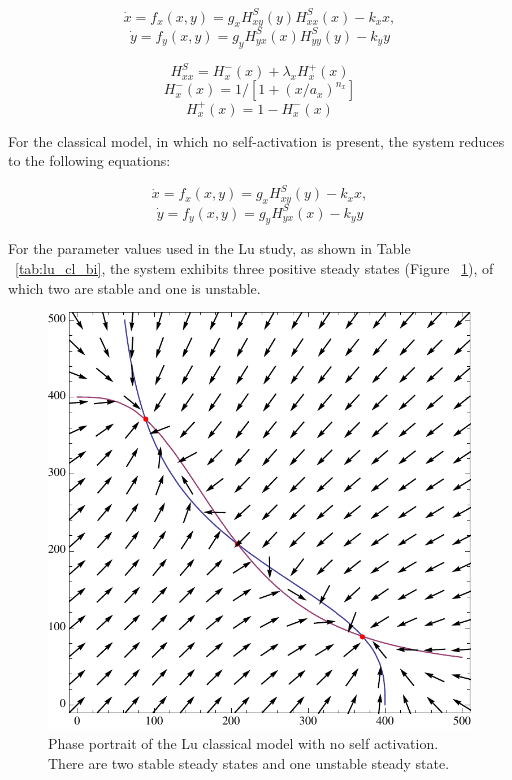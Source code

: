 \begin{equation}\dot{x}=f_{x}(x,y)=g_{x}H^{S}_{xy}(y)H^{S}_{xx}(x)-k_{x}x,\label{eq:lu_both_1}\end{equation}
\begin{equation}\dot{y}=f_{y}(x,y)=g_{y}H^{S}_{yx}(x)H^{S}_{yy}(y)-k_{y}y\label{eq:lu_both_2}\end{equation}

\begin{equation}H^{S}_{xx}=H^{-}_{x}(x)+\lambda_{x}H^{+}_{x}(x)\label{eq:lu_hsxx}\end{equation}
\begin{equation}H^{-}_{x}(x)=1/[1+(x/a_{x})^{n_{x}}]\label{eq:lu_hpx}\end{equation}
\begin{equation}H^{+}_{x}(x)=1-H^{-}_{x}(x)\label{eq:lu_hmx}\end{equation}

For the classical model, in which no self-activation is present, the system reduces to the following equations:

\begin{equation}\dot{x}=f_{x}(x,y)=g_{x}H^{S}_{xy}(y)-k_{x}x,\label{eq:lu_cl_1}\end{equation}
\begin{equation}\dot{y}=f_{y}(x,y)=g_{y}H^{S}_{yx}(x)-k_{y}y\label{eq:lu_cl_2}\end{equation}

For the parameter values used in the Lu study, as shown in Table ~\ref{tab:lu_cl_bi}, the system exhibits three positive steady states (Figure ~\ref{fig:lu_bis_class}), of which two are stable and one is unstable. 

\clearpage
\begin{figure}[p]
\centering
\includegraphics[scale=0.7]{images/Lu/mae/classic.pdf}
\caption{Phase portrait of the Lu classical model with no self activation. There are two stable steady states and one unstable steady state.}
\label{fig:lu_bis_class}
\end{figure}

